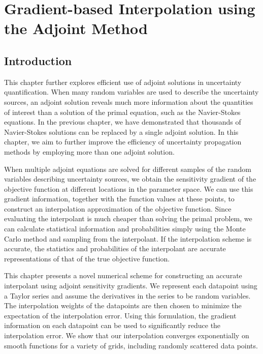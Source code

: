 \chapter[Gradient-based Interpolation]
        {Gradient-based Interpolation using the Adjoint Method}

\newcommand{\R}{\mathbb{R}}
\newcommand{\N}{\mathbb{N}}
\newcommand{\x}{\mathbf{x}}
\newcommand{\y}{\mathbf{y}}
\newcommand{\z}{\mathbf{z}}
\renewcommand{\a}{\mathbf{a}}
\renewcommand{\b}{\mathbf{b}}
\newcommand{\e}{\mathbf{e}}
\newcommand{\0}{\mathbf{0}}

\section{Introduction}

This chapter further explores efficient use of adjoint solutions in
uncertainty quantification.  When many random variables are used
to describe the uncertainty sources, an adjoint solution reveals much more
information about the quantities of interest than a solution of the primal
equation, such as the Navier-Stokes equations.  In the previous chapter,
we have demonstrated that thousands of Navier-Stokes solutions can be replaced
by a single adjoint solution.  In this chapter, we aim to further improve
the efficiency of uncertainty propagation methods by employing more than one
adjoint solution.

When multiple adjoint equations are solved for different samples of the random
variables describing uncertainty sources, we obtain the sensitivity gradient
of the objective function at different locations in the parameter space.
We can use this gradient information, together with the function values at
these points, to construct an interpolation approximation of the objective
function.  Since evaluating the interpolant is much cheaper than solving
the primal problem, we can calculate statistical information and
probabilities simply using the Monte Carlo method and sampling from
the interpolant.  If the interpolation scheme is accurate, the statistics and
probabilities of the interpolant are accurate representations of that of
the true objective function.

This chapter presents a novel numerical scheme for
constructing an accurate interpolant using adjoint sensitivity gradients.
We represent each datapoint using a Taylor
series and assume the derivatives in the series to be random variables.  The
interpolation weights of the datapoints are then chosen to minimize the
expectation of the interpolation error.  Using this formulation, the gradient
information on each datapoint can be used to significantly reduce the
interpolation error.  We show that our interpolation converges exponentially
on smooth functions for a variety of grids, including randomly scattered data
points.


